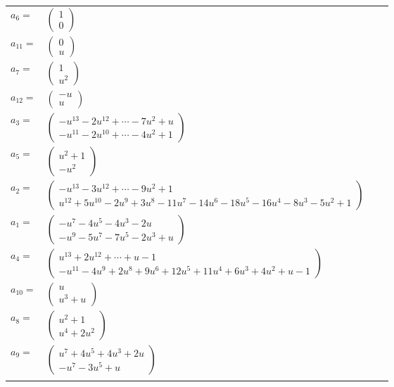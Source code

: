 \documentclass[1p]{elsarticle_modified}
\theoremstyle{definition}
\begin{document}
\begin{tabular}{m{7pt} m{180pt} m{7pt} m{180pt} }
\flushright $a_{6}=$&$\begin{pmatrix}1\\0\end{pmatrix}$ \\
\flushright $a_{11}=$&$\begin{pmatrix}0\\u\end{pmatrix}$ \\
\flushright $a_{7}=$&$\begin{pmatrix}1\\u^2\end{pmatrix}$ \\
\flushright $a_{12}=$&$\begin{pmatrix}- u\\u\end{pmatrix}$ \\
\flushright $a_{3}=$&$\begin{pmatrix}- u^{13}-2 u^{12}+\cdots-7 u^2+u\\- u^{11}-2 u^{10}+\cdots-4 u^2+1\end{pmatrix}$ \\
\flushright $a_{5}=$&$\begin{pmatrix}u^2+1\\- u^2\end{pmatrix}$ \\
\flushright $a_{2}=$&$\begin{pmatrix}- u^{13}-3 u^{12}+\cdots-9 u^2+1\\u^{12}+5 u^{10}-2 u^9+3 u^8-11 u^7-14 u^6-18 u^5-16 u^4-8 u^3-5 u^2+1\end{pmatrix}$ \\
\flushright $a_{1}=$&$\begin{pmatrix}- u^7-4 u^5-4 u^3-2 u\\- u^9-5 u^7-7 u^5-2 u^3+u\end{pmatrix}$ \\
\flushright $a_{4}=$&$\begin{pmatrix}u^{13}+2 u^{12}+\cdots+u-1\\- u^{11}-4 u^9+2 u^8+9 u^6+12 u^5+11 u^4+6 u^3+4 u^2+u-1\end{pmatrix}$ \\
\flushright $a_{10}=$&$\begin{pmatrix}u\\u^3+u\end{pmatrix}$ \\
\flushright $a_{8}=$&$\begin{pmatrix}u^2+1\\u^4+2 u^2\end{pmatrix}$ \\
\flushright $a_{9}=$&$\begin{pmatrix}u^7+4 u^5+4 u^3+2 u\\- u^7-3 u^5+u\end{pmatrix}$\\&\end{tabular}
\end{document}
